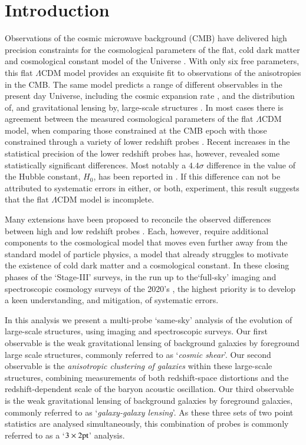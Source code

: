 \section{Introduction}
\label{sec:intro}

Observations of the cosmic microwave background (CMB) have delivered high precision
constraints for the cosmological parameters of the flat, cold dark
matter and cosmological constant model of the Universe
\citep[$\Lambda$CDM,][]{planck/etal:2018}.  With only six free
parameters, this flat $\Lambda$CDM model provides an exquisite fit to observations of
the anisotropies in the CMB.    The same model predicts a range of
different observables in the present day Universe, including the cosmic expansion rate \citep{weinberg/1972}, and the
distribution of, and gravitational lensing by, large-scale
structures \citep{peebles/1980,bartelmann/schneider:2001,eisenstein/etal:2005}.  
In most cases there
is agreement between the measured cosmological parameters of the flat $\Lambda$CDM model, when comparing those
constrained at the CMB epoch with those constrained through a variety of
lower redshift probes \citep[see the discussion in][and references
therein]{planck/etal:2018}.   Recent increases in the statistical
precision of the lower redshift probes has,
however, revealed some statistically significant differences.  Most
notably a $4.4\sigma$ difference in the value of the Hubble constant,
$H_0$, has been reported in \citet{riess/etal:2019}.  If this difference can not be
attributed to systematic errors in either, or both, experiment, this result
suggests that the flat $\Lambda$CDM model is incomplete.

Many
extensions have been proposed to reconcile the observed differences between
high and low redshift probes \citep[see for
example][]{poulin/etal:2018,divalentino/etal:2020}.  Each, however, require
additional components
to the cosmological model that moves even further away from the
standard model of particle physics, a model that already struggles to motivate
the existence of cold dark matter and a cosmological constant.   In these closing phases of the `Stage-III'
surveys, in the run up to the`full-sky' imaging and spectroscopic
cosmology surveys of the 2020's \citep{laureijs/etal:2011,lsst/etal:2009,DESI/etal:2016}, the highest
priority is to develop a keen understanding, and mitigation, of systematic errors.

In this analysis we present a multi-probe `same-sky' analysis of the
evolution of large-scale structures, using imaging and spectroscopic surveys.
Our first observable is the weak gravitational lensing of background
galaxies by foreground large scale
structures, commonly referred to as `{\it cosmic shear}'.    Our second
observable is the {\it anisotropic clustering of galaxies} within these
large-scale structures, combining measurements of both redshift-space
distortions and the redshift-dependent scale of the baryon acoustic
oscillation.   Our third observable is the weak gravitational lensing of background
galaxies by foreground galaxies, commonly referred to as
`{\it galaxy-galaxy lensing}'.   As these three sets of two point
statistics are analysed simultaneously, this combination of probes
is commonly referred to as a `$3\times 2{\rm pt}$' analysis. 

